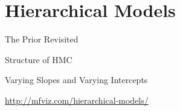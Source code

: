 \section{Hierarchical Models}

\begin{frame}{The Prior Revisited}
\end{frame}

\begin{frame}{Structure of HMC}
\end{frame}

\begin{frame}{Varying Slopes and Varying Intercepts}
\end{frame}

\begin{frame}
  \centering
  \vfill
  \large \url{http://mfviz.com/hierarchical-models/}
  \vfill
\end{frame}
